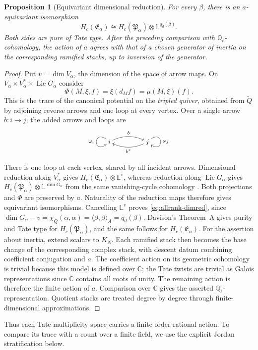 \documentclass[11pt, reqno]{amsart}
\numberwithin{equation}{section}
\newtheorem{proposition}[theorem]{Proposition}
\theoremstyle{definition}
\theoremstyle{remark}
\newcommand{\op}[1]{\operatorname{#1}}
\newcommand{\mb}[1]{\mathbb{#1}}
\newcommand{\Lie}{\op{Lie}}
\newcommand{\Qbar}{\widetilde Q}
\newcommand{\iso}{\cong}
\newcommand{\quiverdiagram}[1]{\vcenter{\hbox{$\displaystyle #1$}}}
\begin{document}
\begin{proposition}[Equivariant dimensional reduction]
\label{prop:allrank-purity}
For every $\beta$, there is an $a$-equivariant isomorphism
\begin{equation}\label{eq:allrank-dimred} H_c(\mathfrak E_\alpha)\iso H_c(\mathfrak P_\alpha)\otimes\mb L^{q_d(\beta)}.\end{equation}
Both sides are pure of Tate type. After the preceding comparison with
$\mb Q_\ell$-cohomology, the action of $a$ agrees with that of a
chosen generator of inertia on the corresponding ramified stacks,
up to inversion of the generator.
\end{proposition}
\begin{proof}
Put $v=\dim V_\alpha$, the dimension of the space of arrow maps.
On $V_\alpha\times V_\alpha^*\times\Lie G_\alpha$ consider
\[ \Phi(M,\xi,f)=\xi(d_Mf)=\mu(M,\xi)(f). \]
This is the trace of the canonical potential on the \emph{tripled quiver}, obtained from $\Qbar$ by adjoining reverse arrows and one
loop at every vertex. Over a single arrow $b:i\to j$, the added
arrows and loops are
\[
\quiverdiagram{\xymatrix@C=4.5em{
i\ar@/^0.65pc/[r]^{b}\ar@(ul,dl)[]_{\omega_i}
&j\ar@/^0.65pc/[l]^{b^*}\ar@(ur,dr)[]^{\omega_j}}}
\]

There is one loop at each vertex, shared by all incident arrows.
Dimensional reduction along $V_\alpha^*$ gives
$H_c(\mathfrak E_\alpha)\otimes\mb L^v$, whereas reduction along
$\Lie G_\alpha$ gives $H_c(\mathfrak P_\alpha)\otimes\mb L^{\dim G_\alpha}$ from the
same vanishing-cycle cohomology
\cite[Section~3.3 and Theorem~3.7]{DavisonStacks}. Both projections
and $\Phi$ are preserved by $a$. Naturality of the reduction maps
therefore gives equivariant isomorphisms. Cancelling $\mb L^v$
proves \eqref{eq:allrank-dimred}, since
$\dim G_\alpha-v=\chi_{\Qbar}(\alpha,\alpha)
=\langle\beta,\beta\rangle_A=q_d(\beta)$.
Davison's Theorem~A gives purity and Tate type for
$H_c(\mathfrak P_\alpha)$, and the same follows for
$H_c(\mathfrak E_\alpha)$. For the assertion about inertia, extend
scalars to $K_N$. Each ramified stack then becomes the base change
of the corresponding complex stack, with descent datum combining
coefficient conjugation and $a$. The coefficient action on its
geometric cohomology is trivial because this model is defined over
$\mb C$; the Tate twists are trivial as Galois representations
since $\mb C$ contains all roots of unity. The remaining action is
therefore the finite action of $a$. Comparison over $\mb C$ gives
the asserted $\mb Q_\ell$-representation. Quotient stacks are
treated degree by degree through finite-dimensional approximations.
\end{proof}
Thus each Tate multiplicity space carries a finite-order rational
action. To compare its trace with a count over a finite field, we use
the explicit Jordan stratification below.
\end{document}
